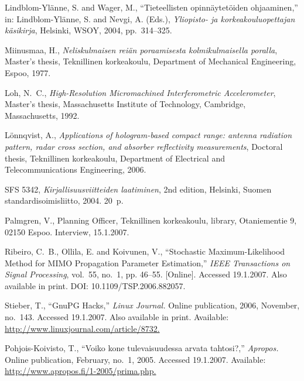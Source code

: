 \documentclass[english, 12pt, a4paper, elec, utf8, a-2b, online]{aaltothesis}
\begin{document}
\begin{thebibliography}{99}
   Lindblom-Ylänne, S. and Wager, M.,
    ``\foreignlanguage{finnish}{Tieteellisten opinnäytetöiden ohjaaminen},'' in:
    Lindblom-Ylänne, S. and Nevgi, A. (Eds.), \textit{Yliopisto- ja
    korkeakouluopettajan käsikirja}, Helsinki, WSOY, 2004, pp.\ 314--325.
 
   Miinusmaa, H., \textit{Neliskulmaisen reiän poraamisesta
	kolmikulmaisella poralla}, Master's thesis, Teknillinen korkeakoulu,
	Department of Mechanical Engineering, Espoo, 1977.
 
   Loh, N.\ C., \textit{High-Resolution Micromachined 
  	Interferometric Accelerometer}, Master's thesis, Massachusetts Institute of 
    Technology, Cambridge, Massachusetts, 1992.

   Lönnqvist, A., \textit{Applications of hologram-based 
  	compact range: antenna radiation pattern, radar cross section, and absorber 
  	reflectivity measurements}, Doctoral thesis, Teknillinen korkeakoulu, 
    Department of Electrical and Telecommunications Engineering, 2006.

   SFS 5342, \textit{Kirjallisuusviitteiden laatiminen}, 2nd 
    edition, Helsinki, Suomen standardisoimisliitto, 2004. 20~p.

   Palmgren, V., Planning Officer, Teknillinen korkeakoulu, 
    library, Otaniementie 9, 02150 Espoo. Interview, 15.1.2007.

   Ribeiro, C.\ B., Ollila, E. and Koivunen, V., ``Stochastic 
	Maximum-Likelihood Method for MIMO Propagation Parameter Estimation,'' 
	\textit{IEEE Transactions on Signal Processing}, vol.~55, no.~1, pp. 46--55.
	[Online]. Accessed 19.1.2007. Also available in print.
	DOI: 10.1109/TSP.2006.882057.

   Stieber, T., ``GnuPG Hacks,'' \textit{Linux Journal.} Online
	publication, 2006, November, no.~143. Accessed 19.1.2007. Also available in 
	print. Available: \url{http://www.linuxjournal.com/article/8732.}

   Pohjois-Koivisto, T., ``\foreignlanguage{finnish}{Voiko kone 
  	tulevaisuudessa arvata tahtosi?,}'' \textit{Apropos.} Online publication, 
	February, no.~1, 2005. Accessed 19.1.2007. Available:
	\url{http://www.apropos.fi/1-2005/prima.php.}


\end{thebibliography}
\end{document}
